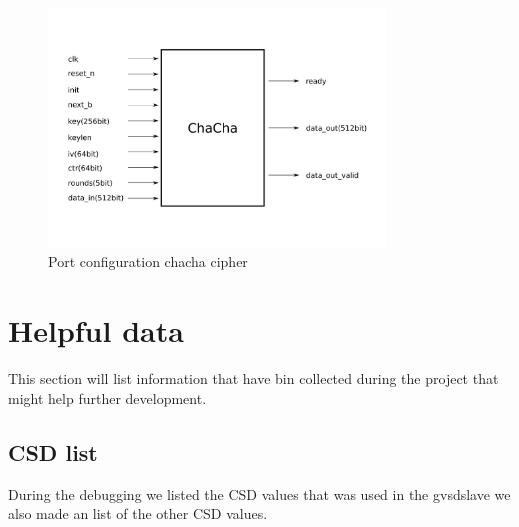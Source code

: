 \documentclass[]{article}
\begin{document}
\begin{figure}[h]
	\centering
	\includegraphics[width=0.8\textwidth]{ilustrations/chacha.pdf}
	\caption{Port configuration chacha cipher}
	\label{fig:chacha}
\end{figure}


\section{Helpful data}
This section will list information that have bin collected during the project that might help further development.

\subsection{CSD list}
During the debugging we listed the CSD values that was used in the \gls{gvsdslave} we also made an list of the other CSD values.
\end{document}

